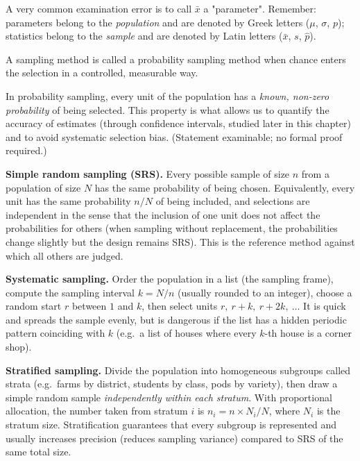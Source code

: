 \documentclass[11pt]{article}
\newcommand{\cle}[1]{{\popxbold\color{popdark}#1}}
\newcounter{popsec}
\newcounter{popsub}
\newcommand{\courssub}[1]{%
  \stepcounter{popsub}%
  \par\vspace{9pt}\noindent{\popxbold\fontsize{11.5}{13}\selectfont\color{popink}{\color{poporange}\thepopsec.\thepopsub}\hspace{6pt}#1}\par\nopagebreak\vspace{4pt}
}
\begin{document}
\begin{attention}
A very common examination error is to call $\bar{x}$ a "parameter". Remember: parameters belong to the \emph{population} and are denoted by Greek letters ($\mu$, $\sigma$, $p$); statistics belong to the \emph{sample} and are denoted by Latin letters ($\bar{x}$, $s$, $\hat{p}$).
\end{attention}

\courssub{Probability Sampling Methods}

A sampling method is called a \cle{probability sampling} method when chance enters the selection in a controlled, measurable way.

\begin{propriete}
In probability sampling, every unit of the population has a \emph{known, non-zero probability} of being selected. This property is what allows us to quantify the accuracy of estimates (through confidence intervals, studied later in this chapter) and to avoid systematic selection bias. (Statement examinable; no formal proof required.)
\end{propriete}

\textbf{Simple random sampling (SRS).} Every possible sample of size $n$ from a population of size $N$ has the same probability of being chosen. Equivalently, every unit has the same probability $n/N$ of being included, and selections are independent in the sense that the inclusion of one unit does not affect the probabilities for others (when sampling without replacement, the probabilities change slightly but the design remains SRS). This is the reference method against which all others are judged.

\textbf{Systematic sampling.} Order the population in a list (the \cle{sampling frame}), compute the sampling interval $k = N/n$ (usually rounded to an integer), choose a random start $r$ between $1$ and $k$, then select units $r,\ r+k,\ r+2k,\ \dots$ It is quick and spreads the sample evenly, but is dangerous if the list has a hidden periodic pattern coinciding with $k$ (e.g.\ a list of houses where every $k$-th house is a corner shop).

\textbf{Stratified sampling.} Divide the population into homogeneous subgroups called \cle{strata} (e.g.\ farms by district, students by class, pods by variety), then draw a simple random sample \emph{independently within each stratum}. With \cle{proportional allocation}, the number taken from stratum $i$ is $n_i = n \times N_i/N$, where $N_i$ is the stratum size. Stratification guarantees that every subgroup is represented and usually increases precision (reduces sampling variance) compared to SRS of the same total size.
\end{document}
